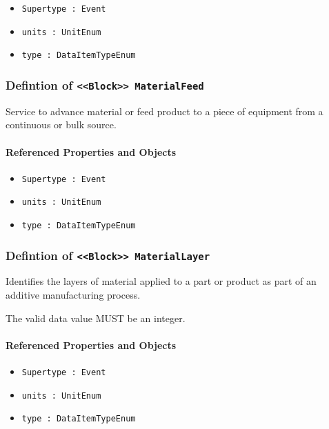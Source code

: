 \begin{itemize}
\item \texttt{Supertype : Event}

\item \texttt{units : UnitEnum}

\item \texttt{type : DataItemTypeEnum}

\end{itemize}
\FloatBarrier
\subsubsection{Defintion of \texttt{<<Block>> MaterialFeed}}
  \label{type:MaterialFeed}

\FloatBarrier

Service to advance material or feed product to a piece of equipment from a continuous or bulk source.

\FloatBarrier
\paragraph{Referenced Properties and Objects}

\begin{itemize}
\item \texttt{Supertype : Event}

\item \texttt{units : UnitEnum}

\item \texttt{type : DataItemTypeEnum}

\end{itemize}
\FloatBarrier
\subsubsection{Defintion of \texttt{<<Block>> MaterialLayer}}
  \label{type:MaterialLayer}

\FloatBarrier

Identifies the layers of material applied to a part or product as part of an additive manufacturing process.
  
 The valid data value MUST be an integer.

\FloatBarrier
\paragraph{Referenced Properties and Objects}

\begin{itemize}
\item \texttt{Supertype : Event}

\item \texttt{units : UnitEnum}

\item \texttt{type : DataItemTypeEnum}

\end{itemize}
\FloatBarrier
